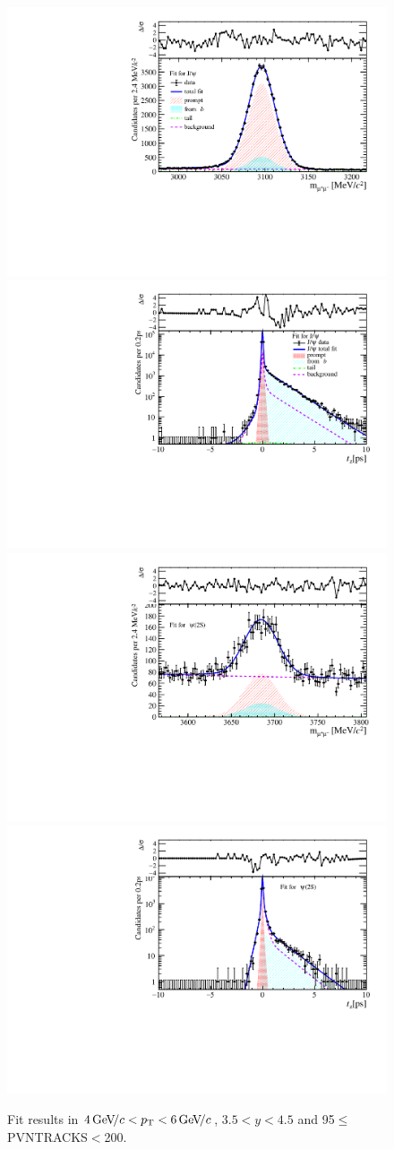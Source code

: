 \begin{figure}[H]
\begin{center}
\includegraphics[width=0.47\linewidth]{pdf/Jpsi/drawmass/n5y3pt3.pdf}
\includegraphics[width=0.47\linewidth]{pdf/Jpsi/2DFit/n5y3pt3.pdf}
\vspace*{-0.5cm}
\includegraphics[width=0.47\linewidth]{pdf/Psi2S/drawmass/n5y3pt3.pdf}
\includegraphics[width=0.47\linewidth]{pdf/Psi2S/2DFit/n5y3pt3.pdf}
\vspace*{-0.5cm}
\end{center}
\caption{Fit results in $4\text{\,Ge\kern -0.1em V\!/}c<p_{\mathrm{T}}<6\text{\,Ge\kern -0.1em V\!/}c$, $3.5<y<4.5$ and 95$\leq$PVNTRACKS$<$200.}
\label{Fitn5y3pt3}
\end{figure}
